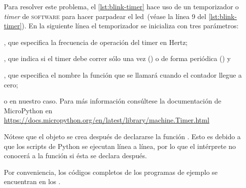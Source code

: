Para resolver este problema, el \cref{lst:blink-timer} hace uso de un temporizador o \emph{timer} de \textsc{software}\footnotemark{} para hacer parpadear el led~(véase la línea 9 del \cref{lst:blink-timer}).
En la siguiente línea el temporizador se inicializa con tres parámetros:
\begin{enumerate*}[label=\roman*\rpar]
	\item {}, que especifica la frecuencia de operación del timer en Hertz;
	\item {}, que indica si el timer debe correr sólo una vez () o de forma periódica ()
	y
	\item {}, que especifica el nombre la función que se llamará cuando el contador llegue a cero;
\end{enumerate*}
o  en nuestro caso.
Para más información consúltese la documentación de MicroPython en \url{https://docs.micropython.org/en/latest/library/machine.Timer.html}



Nótese que el objeto  se crea después de declararse la función .
Esto es debido a que los scripts de Python se ejecutan línea a línea, por lo que el intérprete no conocerá a la función  si ésta se declara después.

Por conveniencia, los códigos completos de los programas de ejemplo se encuentran en los .
